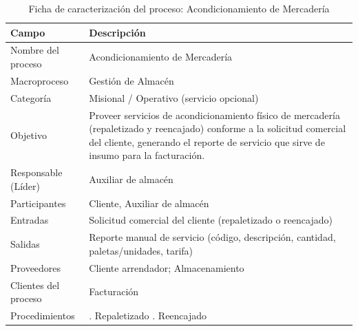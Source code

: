 \documentclass[11pt, a4paper, oneside]{report}
\begin{document}
\begin{table}[H]
\centering\small
\renewcommand{\arraystretch}{1.35}
\setlength{\tabcolsep}{6pt}
\begin{tabularx}{\textwidth}{|>{\raggedright\arraybackslash}p{}|>{\raggedright\arraybackslash}X|}
\hline
\rowcolor{upeu_dark}
\color{white}\bfseries Campo & \color{white}\bfseries Descripción \\ \hline
\rowcolor{gray!10}
Nombre del proceso & Acondicionamiento de Mercadería \\ \hline
Macroproceso & Gestión de Almacén \\ \hline
\rowcolor{gray!10}
Categoría & Misional / Operativo (servicio opcional) \\ \hline
Objetivo & Proveer servicios de acondicionamiento físico de mercadería (repaletizado y reencajado) conforme a la solicitud comercial del cliente, generando el reporte de servicio que sirve de insumo para la facturación. \\ \hline
\rowcolor{gray!10}
Responsable (Líder) & Auxiliar de almacén \\ \hline
Participantes & Cliente, Auxiliar de almacén \\ \hline
\rowcolor{gray!10}
Entradas & Solicitud comercial del cliente (repaletizado o reencajado) \\ \hline
Salidas & Reporte manual de servicio (código, descripción, cantidad, paletas/unidades, tarifa) \\ \hline
\rowcolor{gray!10}
Proveedores & Cliente arrendador; Almacenamiento \\ \hline
Clientes del proceso & Facturación \\ \hline
\rowcolor{gray!10}
Procedimientos & 1. Repaletizado \newline 2. Reencajado \\ \hline
\end{tabularx}
\caption{Ficha de caracterización del proceso: Acondicionamiento de Mercadería}
\end{table}
\end{document}
